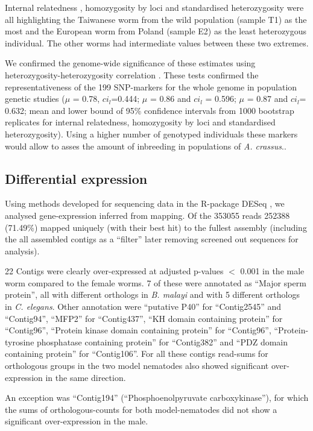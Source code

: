 \documentclass[10pt]{bmc_article}
\newenvironment{bmcformat}{\begin{raggedright}\baselineskip20pt\sloppy\setboolean{publ}{false}}{\end{raggedright}\baselineskip20pt\sloppy}
\begin{document}
\begin{bmcformat}
Internal relatedness \cite{pmid11571049}, homozygosity by loci
\cite{pmid17107491} and standardised heterozygosity \cite{coltman81j}
were all highlighting the Taiwanese worm from the wild population
(sample T1) as the most and the European worm from Poland (sample E2)
as the least heterozygous individual. The other worms had intermediate
values between these two extremes.

We confirmed the genome-wide significance of these estimates using
heterozygosity-heterozygosity correlation \cite{pmid21565077}. These
tests confirmed the representativeness of the 199
SNP-markers for the whole genome in population genetic studies ($\mu$
= 0.78, $ci_l$=0.444; $\mu$ = 0.86 and $ci_l$ = 0.596; $\mu$ = 0.87
and $ci_l$= 0.632; mean and lower bound of 95\% confidence intervals
from 1000 bootstrap replicates for internal relatedness, homozygosity
by loci and standardised heterozygosity). Using a higher number of
genotyped individuals these markers would allow to asses the amount of
inbreeding in populations of \textit{A. crassus}..

\subsection*{Differential expression}
                

Using methods developed for sequencing data in the R-package DESeq
\cite{pmid20979621}, we analysed gene-expression inferred from
mapping. Of the 353055 reads 252388
(71.49\%) mapped uniquely
(with their best hit) to the fullest assembly (including the all
assembled contigs as a ``filter'' later removing screened out
sequences for analysis).

22 Contigs were clearly over-expressed at adjusted p-values $<$ 0.001
in the male worm compared to the female worms.
7 of these were
annotated as ``Major sperm protein'', all with different orthologs in
\textit{B. malayi} and with
5
different orthologs in \textit{C. elegans}. Other annotation were
``putative P40'' for ``Contig2545'' and ``Contig94'', ``MFP2'' for
``Contig437'', ``KH domain containing protein'' for ``Contig96'',
``Protein kinase domain containing protein'' for ``Contig96'',
``Protein-tyrosine phosphatase containing protein'' for ``Contig382''
and ``PDZ domain containing protein'' for ``Contig106''. For all these
contigs read-sums for orthologous groups in the two model nematodes
also showed significant over-expression in the same direction.

An exception was ``Contig194'' (``Phosphoenolpyruvate
carboxykinase''), for which the sums of orthologous-counts for both
model-nematodes did not show a significant over-expression in the
male.


\end{bmcformat}
\end{document}
